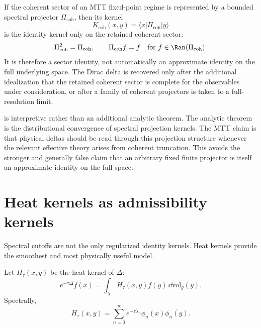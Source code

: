 \documentclass[11pt]{article}
\begin{document}
\begin{corollary}\label{cor:mtt-reading}
If the coherent sector of an MTT fixed-point regime is represented by a bounded spectral
projector \(\Pi_{\mathrm{coh}}\), then its kernel
\begin{equation}
K_{\mathrm{coh}}(x,y)=\langle x|\Pi_{\mathrm{coh}}|y\rangle
\end{equation}
is the identity kernel only on the retained coherent sector:
\begin{equation}
\Pi_{\mathrm{coh}}^2=\Pi_{\mathrm{coh}},\qquad
\Pi_{\mathrm{coh}}f=f\quad\text{for }f\in\Ran(\Pi_{\mathrm{coh}}).
\end{equation}
It is therefore a sector identity, not automatically an approximate identity on the full
underlying space. The Dirac delta is recovered only after the additional idealization that
the retained coherent sector is complete for the observables under consideration, or after a
family of coherent projectors is taken to a full-resolution limit.
\end{corollary}

\begin{remark}
 is interpretive rather than an additional analytic theorem.  The
analytic theorem is the distributional convergence of spectral projection kernels.  The MTT
claim is that physical deltas should be read through this projection structure whenever the
relevant effective theory arises from coherent truncation. This avoids the stronger and
generally false claim that an arbitrary fixed finite projector is itself an approximate
identity on the full space.
\end{remark}

\section{Heat kernels as admissibility kernels}

Spectral cutoffs are not the only regularized identity kernels.  Heat kernels provide the
smoothest and most physically useful model.

Let \(H_\tau(x,y)\) be the heat kernel of \(\Delta\):
\begin{equation}
e^{-\tau\Delta}f(x)=\int_X H_\tau(x,y)f(y)\,\dd\mathrm{vol}_g(y).
\end{equation}
Spectrally,
\begin{equation}
H_\tau(x,y)=\sum_{n=0}^{\infty}e^{-\tau\lambda_n}\phi_n(x)\overline{\phi_n(y)}.
\end{equation}
\end{document}
